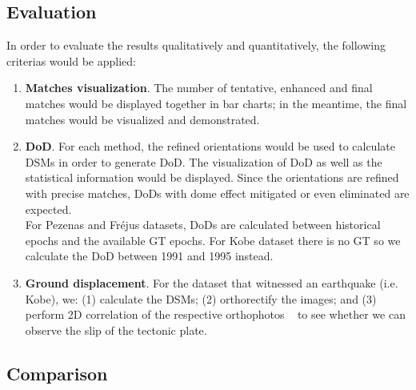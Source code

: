 \subsection{Evaluation}
In order to evaluate the results qualitatively and quantitatively, the following criterias would be applied:\\
\begin{enumerate}
	\item \textbf{Matches visualization}. The number of tentative, enhanced and final matches would be displayed together in bar charts; in the meantime, the final matches would be visualized and demonstrated.
	\item \textbf{\ac{DoD}}. For each method, the refined orientations would be used to calculate DSMs in order to generate \ac{DoD}. The visualization of \ac{DoD} as well as the statistical information would be displayed. Since the orientations are refined with precise matches, \ac{DoD}s with dome effect mitigated or even eliminated are expected.\\
	For Pezenas and Fr\'ejus datasets, DoDs are calculated between historical epochs and the available \ac{GT} epochs. For Kobe dataset there is no \ac{GT} so we calculate the \ac{DoD} between 1991 and 1995 instead.\\
	\item \textbf{Ground displacement}. For the dataset that witnessed an earthquake (i.e. Kobe), we: (1) calculate the DSMs; (2) orthorectify the images; and (3) perform 2D correlation of the respective orthophotos ~\cite{rosu2015measurement} to see whether we can observe the slip of the tectonic plate.
\end{enumerate}


\subsection{Comparison}
